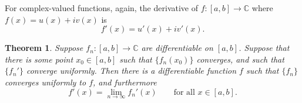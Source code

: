 \documentclass[12pt]{book}
\newcommand{\C}{{\mathbb{C}}}
\theoremstyle{plain}
\newtheorem{thm}{Theorem}[section]
\theoremstyle{remark}
\theoremstyle{definition}
\theoremstyle{exercise}
\theoremstyle{example}
\begin{document}
For complex-valued functions, again, the derivative of $f \colon [a,b] \to
\C$ where $f(x) = u(x)+iv(x)$ is
\begin{equation*}
f'(x) = u'(x)+iv'(x) .
\end{equation*}

\begin{thm}
Suppose $f_n \colon [a,b] \to \C$ are differentiable on $[a,b]$.
Suppose that there is some point $x_0 \in [a,b]$ such that $\{ f_n(x_0) \}$
converges, and such that $\{ f_n' \}$ converge uniformly.
Then there is a differentiable function $f$ such that
$\{ f_n \}$ converges uniformly to $f$, and furthermore
\begin{equation*}
f'(x) = \lim_{n\to\infty} f_n'(x) \qquad \text{for all $x \in [a,b]$.}
\end{equation*}
\end{thm}
\end{document}
